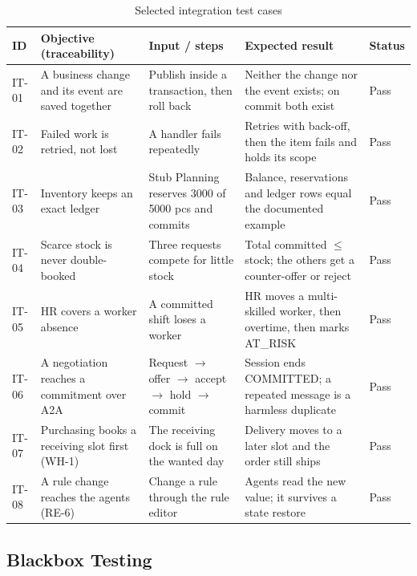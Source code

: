 \begin{table}[h]
\centering
\small
\renewcommand{\arraystretch}{1.2}
\begin{tabular}{|p{}|p{}|p{}|p{}|p{}|}
\hline
\textbf{ID} & \textbf{Objective (traceability)} & \textbf{Input / steps} & \textbf{Expected result} & \textbf{Status} \\ \hline
IT-01 & A business change and its event are saved together & Publish inside a transaction, then roll back
      & Neither the change nor the event exists; on commit both exist & Pass \\ \hline
IT-02 & Failed work is retried, not lost & A handler fails repeatedly
      & Retries with back-off, then the item fails and holds its scope & Pass \\ \hline
IT-03 & Inventory keeps an exact ledger & Stub Planning reserves 3000 of 5000 pcs and commits
      & Balance, reservations and ledger rows equal the documented example & Pass \\ \hline
IT-04 & Scarce stock is never double-booked & Three requests compete for little stock
      & Total committed $\le$ stock; the others get a counter-offer or reject & Pass \\ \hline
IT-05 & HR covers a worker absence & A committed shift loses a worker
      & HR moves a multi-skilled worker, then overtime, then marks AT\_RISK & Pass \\ \hline
IT-06 & A negotiation reaches a commitment over A2A & Request $\rightarrow$ offer $\rightarrow$ accept $\rightarrow$ hold $\rightarrow$ commit
      & Session ends COMMITTED; a repeated message is a harmless duplicate & Pass \\ \hline
IT-07 & Purchasing books a receiving slot first (WH-1) & The receiving dock is full on the wanted day
      & Delivery moves to a later slot and the order still ships & Pass \\ \hline
IT-08 & A rule change reaches the agents (RE-6) & Change a rule through the rule editor
      & Agents read the new value; it survives a state restore & Pass \\ \hline
\end{tabular}
\caption{Selected integration test cases}
\label{tab:int-cases}
\end{table}

\subsection{Blackbox Testing}

